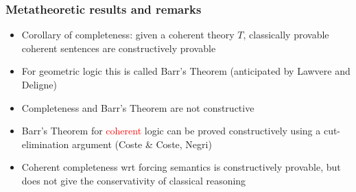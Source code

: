 \documentclass[handout,11pt,hyperref ={colorlinks = true, urlcolor = red}]{beamer}
\newcommand{\red}[1]{\textcolor{red}{#1}}
\begin{document}
\begin{comment}
\begin{frame}
\frametitle{Soundness and completeness wrt Tarski semantics}
 \begin{itemize}[<+->]   %
    \item Soundness easily proved by induction on $\Gamma\vdash_{\vec{y}}^T A$
    \item \red{Not} complete: $\emptyset\vdash_{\emptyset}^{\forall x.\bot} p$
    underivable without a constant in $\Sigma$
    \item Silly, let's assume a constant in $\Sigma$, or just $\exists x.\top$
    \item Proof of completeness: essentially non-constructive.
    Assume $\forall\vec{y}.~(\Gamma \to A)$ holds in any model of $T$.
    Build the tree for $\Gamma\vdash_{\vec{y}}^T A$. Recall the that 
    the sets $\Gamma$ grow along the branches. If the tree is finite, 
    it is a proof (2 cannot happen). If not, it has an infinite branch
    by K\"onig's Lemma. Collect the set of variables $Y$ and the set
    of atoms $M$ along the infinite branch. Build a model with domain
    $\mathrm{Tm}^\Sigma(Y)$ and positive diagram $M$. This is a model of
    $T$ (\red{by fairness}) containing $\Gamma$ but not $A$. Contradiction.
 
    \item Proof theory easily extended to arbitrary coherent 
    conclusions of a coherent theory $T$.
 \end{itemize}
\end{frame}
\end{comment}

\begin{frame}
\frametitle{Metatheoretic results and remarks}
 \begin{itemize}[<+->]   %
    \item Corollary of completeness: given a coherent theory $T$,
    classically provable coherent sentences are constructively provable
    \item For \alert{geometric} logic this is called Barr's Theorem
    (anticipated by Lawvere and Deligne)
    \item Completeness and Barr's Theorem are \alert{not} constructive
    \item Barr's Theorem for \red{coherent} logic can be proved 
    constructively using a cut-elimination argument (Coste \& Coste, Negri) 
    \item Coherent completeness wrt forcing semantics is constructively
    provable, but does not give the conservativity of classical reasoning
  \end{itemize}
\end{frame}
\end{document}
